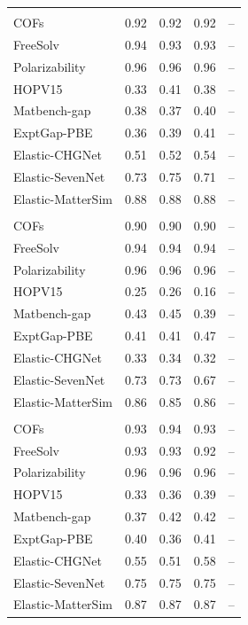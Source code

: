 \begin{table}[p]
\begin{tabular}{@{}lcccc@{}}
\addlinespace
\multicolumn{5}{@{}l}{\emph{TL-E2E}} \\
COFs & 0.92 & 0.92 & 0.92 & -- \\
FreeSolv & 0.94 & 0.93 & 0.93 & -- \\
Polarizability & 0.96 & 0.96 & 0.96 & -- \\
HOPV15 & 0.33 & 0.41 & 0.38 & -- \\
Matbench-gap & 0.38 & 0.37 & 0.40 & -- \\
ExptGap-PBE & 0.36 & 0.39 & 0.41 & -- \\
Elastic-CHGNet & 0.51 & 0.52 & 0.54 & -- \\
Elastic-SevenNet & 0.73 & 0.75 & 0.71 & -- \\
Elastic-MatterSim & 0.88 & 0.88 & 0.88 & -- \\
\addlinespace
\multicolumn{5}{@{}l}{\emph{TL-SPS}} \\
COFs & 0.90 & 0.90 & 0.90 & -- \\
FreeSolv & 0.94 & 0.94 & 0.94 & -- \\
Polarizability & 0.96 & 0.96 & 0.96 & -- \\
HOPV15 & 0.25 & 0.26 & 0.16 & -- \\
Matbench-gap & 0.43 & 0.45 & 0.39 & -- \\
ExptGap-PBE & 0.41 & 0.41 & 0.47 & -- \\
Elastic-CHGNet & 0.33 & 0.34 & 0.32 & -- \\
Elastic-SevenNet & 0.73 & 0.73 & 0.67 & -- \\
Elastic-MatterSim & 0.86 & 0.85 & 0.86 & -- \\
\addlinespace
\multicolumn{5}{@{}l}{\emph{TL-MMD}} \\
COFs & 0.93 & 0.94 & 0.93 & -- \\
FreeSolv & 0.93 & 0.93 & 0.92 & -- \\
Polarizability & 0.96 & 0.96 & 0.96 & -- \\
HOPV15 & 0.33 & 0.36 & 0.39 & -- \\
Matbench-gap & 0.37 & 0.42 & 0.42 & -- \\
ExptGap-PBE & 0.40 & 0.36 & 0.41 & -- \\
Elastic-CHGNet & 0.55 & 0.51 & 0.58 & -- \\
Elastic-SevenNet & 0.75 & 0.75 & 0.75 & -- \\
Elastic-MatterSim & 0.87 & 0.87 & 0.87 & -- \\
\bottomrule
\end{tabular}
\end{table}


